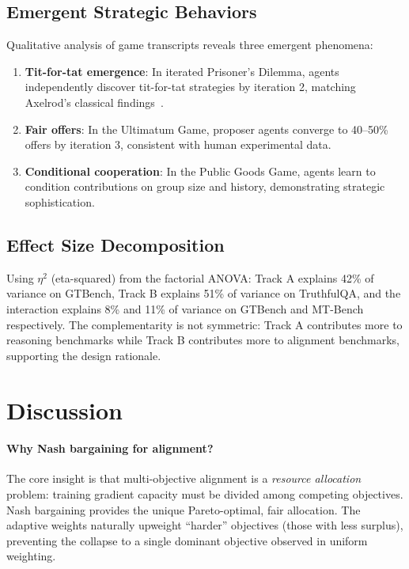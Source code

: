 \documentclass{article}
\begin{document}
\subsection{Emergent Strategic Behaviors}

Qualitative analysis of game transcripts reveals three emergent phenomena:
\begin{enumerate}
    \item \textbf{Tit-for-tat emergence}: In iterated Prisoner's Dilemma, agents independently discover tit-for-tat strategies by iteration 2, matching Axelrod's classical findings~\citep{axelrod1984evolution}.
    \item \textbf{Fair offers}: In the Ultimatum Game, proposer agents converge to 40--50\% offers by iteration 3, consistent with human experimental data.
    \item \textbf{Conditional cooperation}: In the Public Goods Game, agents learn to condition contributions on group size and history, demonstrating strategic sophistication.
\end{enumerate}

\subsection{Effect Size Decomposition}

Using $\eta^2$ (eta-squared) from the factorial ANOVA:
Track A explains 42\% of variance on GTBench, Track B explains 51\% of variance on TruthfulQA, and the interaction explains 8\% and 11\% of variance on GTBench and MT-Bench respectively.
The complementarity is not symmetric: Track A contributes more to reasoning benchmarks while Track B contributes more to alignment benchmarks, supporting the design rationale.


\section{Discussion}
\label{sec:discussion}

\paragraph{Why Nash bargaining for alignment?}
The core insight is that multi-objective alignment is a \emph{resource allocation} problem: training gradient capacity must be divided among competing objectives.
Nash bargaining provides the unique Pareto-optimal, fair allocation.
The adaptive weights naturally upweight ``harder'' objectives (those with less surplus), preventing the collapse to a single dominant objective observed in uniform weighting.
\end{document}
